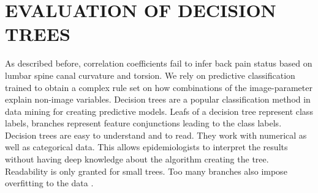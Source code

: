\documentclass[a4paper,twoside]{style/article}
\newcommand{\com}[1]{\textcolor{orange}{\uline{#1}}}
\begin{document}
%


\section{\uppercase{Evaluation of Decision Trees}}
\label{sec:DecisionTrees}
\noindent As described before, correlation coefficients fail to infer back pain status based on lumbar spine canal curvature and torsion.
We rely on predictive classification trained to obtain a complex rule set on how combinations of the image-parameter explain non-image variables.
Decision trees are a popular classification method in data mining for creating predictive models.
Leafs of a decision tree represent class labels, branches represent feature conjunctions leading to the class labels.
Decision trees are easy to understand and to read.
They work with numerical as well as categorical data.
This allows epidemiologists to interpret the results without having deep knowledge about the algorithm creating the tree.
Readability is only granted for small trees. %
Too many branches also impose overfitting to the data \cite{DecisionTree}.
\end{document}
